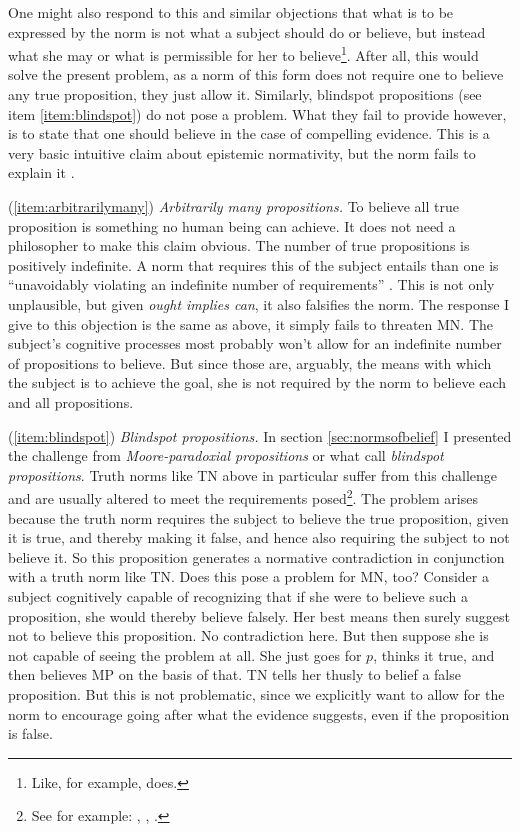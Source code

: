 \documentclass[12pt,numbers=noenddot]{scrartcl}
\begin{document}
One might also respond to this and similar objections that what is to be expressed by the norm is not what a subject should do or believe, but instead what she may or what is permissible for her to believe\footnote{Like, for example, \textcite{Whiting2013-WHITTA-3} does.}. After all, this would solve the present problem, as a norm of this form does not require one to believe any true proposition, they just allow it. Similarly, blindspot propositions (see item \ref{item:blindspot}) do not pose a problem. What they fail to provide however, is to state that one should believe in the case of compelling evidence. This is a very basic intuitive claim about epistemic normativity, but the norm fails to explain it \textcite[18]{Mchugh2012-MCHTTN}.

(\ref{item:arbitrarilymany}) \emph{Arbitrarily many propositions.}
To believe all true proposition is something no human being can achieve. It does not need a philosopher to make this claim obvious. The number of true propositions is positively indefinite. A norm that requires this of the subject entails than one is “unavoidably violating an indefinite number of requirements” \autocite[12]{Mchugh2012-MCHTTN}. This is not only unplausible, but given \emph{ought implies can}, it also falsifies the norm. The response I give to this objection is the same as above, it simply fails to threaten MN. The subject's cognitive processes most probably won't allow for an indefinite number of propositions to believe. But since those are, arguably, the means with which the subject is to achieve the goal, she is not required by the norm to believe each and all propositions.

(\ref{item:blindspot}) \emph{Blindspot propositions.}
In section \ref{sec:normsofbelief} I presented the challenge from \emph{Moore-paradoxial propositions} or what \textcite[281]{Bykvist2007-BYKDTI} call \emph{blindspot propositions}. Truth norms like TN above in particular suffer from this challenge and are usually altered to meet the requirements posed\footnote{See for example: \textcite[282]{Bykvist2007-BYKDTI}, \textcite[12]{Mchugh2012-MCHTTN}, \textcite[6]{Greenberg2016-GREITN}.}. The problem arises because the truth norm requires the subject to believe the true proposition, given it is true, and thereby making it false, and hence also requiring the subject to not believe it. So this proposition generates a normative contradiction in conjunction with a truth norm like TN. Does this pose a problem for MN, too? Consider a subject cognitively capable of recognizing that if she were to believe such a proposition, she would thereby believe falsely. Her best means then surely suggest not to believe this proposition. No contradiction here. But then suppose she is not capable of seeing the problem at all. She just goes for $p$, thinks it true, and then believes MP on the basis of that. TN tells her thusly to belief a false proposition. But this is not problematic, since we explicitly want to allow for the norm to encourage going after what the evidence suggests, even if the proposition is false.
\end{document}
